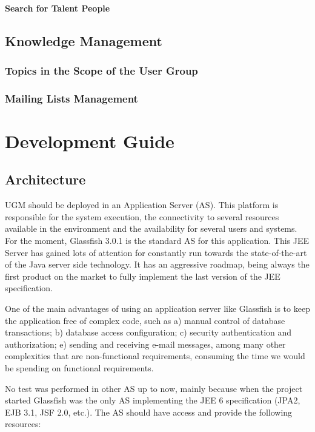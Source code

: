 \documentclass[envcountsame,envcountchap]{svmono}
\begin{document}
\subsection{Search for Talent People}

\chapter{Knowledge Management}

\section{Topics in the Scope of the User Group}

\section{Mailing Lists Management}

\part{Development Guide}

\chapter{Architecture}

UGM should be deployed in an Application Server (AS). This platform is responsible for the system execution, the connectivity to several resources available in the environment and the availability for several users and systems. For the moment, Glassfish 3.0.1 is the standard AS for this application. This JEE Server has gained lots of attention for constantly run towards the state-of-the-art of the Java server side technology. It has an aggressive roadmap, being always the first product on the market to fully implement the last version of the JEE specification.

One of the main advantages of using an application server like Glassfish is to keep the application free of complex code, such as a) manual control of database transactions; b) database access configuration; c) security authentication and authorization; e) sending and receiving e-mail messages, among many other complexities that are non-functional requirements, consuming the time we would be spending on functional requirements.

No test was performed in other AS up to now, mainly because when the project started Glassfish was the only AS implementing the JEE 6 specification (JPA2, EJB 3.1, JSF 2.0, etc.). The AS should have access and provide the following resources:
\end{document}
